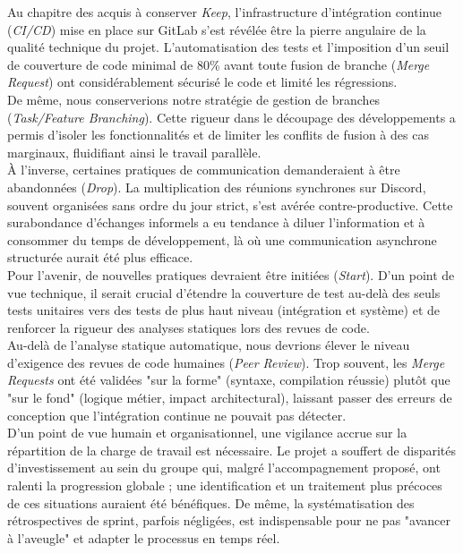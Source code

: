 Au chapitre des acquis à conserver \textit{Keep}, l'infrastructure d'intégration continue (\textit{CI/CD}) mise en place sur GitLab s'est révélée être la pierre angulaire de la qualité technique du projet. L'automatisation des tests et l'imposition d'un seuil de couverture de code minimal de 80\% avant toute fusion de branche (\textit{Merge Request}) ont considérablement sécurisé le code et limité les régressions.\\

De même, nous conserverions notre stratégie de gestion de branches (\textit{Task/Feature Branching}). Cette rigueur dans le découpage des développements a permis d'isoler les fonctionnalités et de limiter les conflits de fusion à des cas marginaux, fluidifiant ainsi le travail parallèle.\\

À l'inverse, certaines pratiques de communication demanderaient à être abandonnées (\textit{Drop}). La multiplication des réunions synchrones sur Discord, souvent organisées sans ordre du jour strict, s'est avérée contre-productive. Cette surabondance d'échanges informels a eu tendance à diluer l'information et à consommer du temps de développement, là où une communication asynchrone structurée aurait été plus efficace.\\

Pour l'avenir, de nouvelles pratiques devraient être initiées (\textit{Start}). D'un point de vue technique, il serait crucial d'étendre la couverture de test au-delà des seuls tests unitaires vers des tests de plus haut niveau (intégration et système) et de renforcer la rigueur des analyses statiques lors des revues de code.\\

Au-delà de l'analyse statique automatique, nous devrions élever le niveau d'exigence des revues de code humaines (\textit{Peer Review}). Trop souvent, les \textit{Merge Requests} ont été validées "sur la forme" (syntaxe, compilation réussie) plutôt que "sur le fond" (logique métier, impact architectural), laissant passer des erreurs de conception que l'intégration continue ne pouvait pas détecter.\\

D'un point de vue humain et organisationnel, une vigilance accrue sur la répartition de la charge de travail est nécessaire. Le projet a souffert de disparités d'investissement au sein du groupe qui, malgré l'accompagnement proposé, ont ralenti la progression globale ; une identification et un traitement plus précoces de ces situations auraient été bénéfiques. De même, la systématisation des rétrospectives de sprint, parfois négligées, est indispensable pour ne pas "avancer à l'aveugle" et adapter le processus en temps réel.\\

